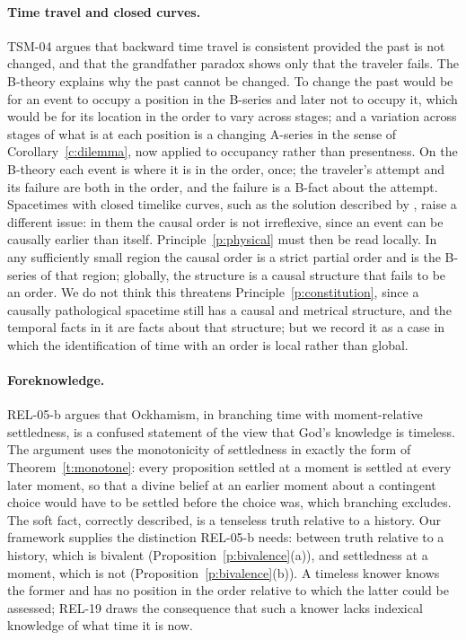 \documentclass{situationist-preprint}
\begin{document}
\paragraph{Time travel and closed curves.} TSM-04 argues that backward time travel is consistent provided the past is not changed, and that the grandfather paradox shows only that the traveler fails. The B-theory explains why the past cannot be changed. To change the past would be for an event to occupy a position in the B-series and later not to occupy it, which would be for its location in the order to vary across stages; and a variation across stages of what is at each position is a changing A-series in the sense of Corollary~\ref{c:dilemma}, now applied to occupancy rather than presentness. On the B-theory each event is where it is in the order, once; the traveler's attempt and its failure are both in the order, and the failure is a B-fact about the attempt. Spacetimes with closed timelike curves, such as the solution described by \citet{Godel1949}, raise a different issue: in them the causal order is not irreflexive, since an event can be causally earlier than itself. Principle~\ref{p:physical} must then be read locally. In any sufficiently small region the causal order is a strict partial order and is the B-series of that region; globally, the structure is a causal structure that fails to be an order. We do not think this threatens Principle~\ref{p:constitution}, since a causally pathological spacetime still has a causal and metrical structure, and the temporal facts in it are facts about that structure; but we record it as a case in which the identification of time with an order is local rather than global.

\paragraph{Foreknowledge.} REL-05-b argues that Ockhamism, in branching time with moment-relative settledness, is a confused statement of the view that God's knowledge is timeless. The argument uses the monotonicity of settledness in exactly the form of Theorem~\ref{t:monotone}: every proposition settled at a moment is settled at every later moment, so that a divine belief at an earlier moment about a contingent choice would have to be settled before the choice was, which branching excludes. The soft fact, correctly described, is a tenseless truth relative to a history. Our framework supplies the distinction REL-05-b needs: between truth relative to a history, which is bivalent (Proposition~\ref{p:bivalence}(a)), and settledness at a moment, which is not (Proposition~\ref{p:bivalence}(b)). A timeless knower knows the former and has no position in the order relative to which the latter could be assessed; REL-19 draws the consequence that such a knower lacks indexical knowledge of what time it is now.
\end{document}
